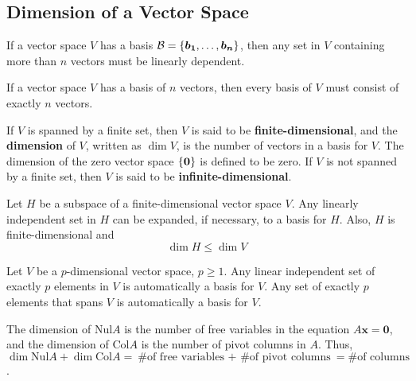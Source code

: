 \documentclass[11pt]{scrartcl}
\theoremstyle{dotlessP}
\theoremstyle{dotlessN}
\DeclarePairedDelimiter\set{\{}{\}}
\newcommand{\nul}{\text{Nul}}
\newcommand{\col}{\text{Col}}
\newcommand{\basis}{\mathcal{B}}
\begin{document}
\subsection{Dimension of a Vector Space}
\begin{theorem}
	If a vector space $V$ has a basis $\basis = \set*{\bm{b_1}, \dots, \bm{b_n}}$, then any set in $V$ containing more than $n$ vectors must be linearly dependent.
\end{theorem}
\begin{theorem}
	If a vector space $V$ has a basis of $n$ vectors, then every basis of $V$ must consist of exactly $n$ vectors.
\end{theorem}
\begin{definition}
	If $V$ is spanned by a finite set, then $V$ is said to be \textbf{finite-dimensional}, and the \textbf{dimension} of $V$, written as $\dim V$, is the number of vectors in a basis for $V$. The dimension of the zero vector space $\set*{\bm{0}}$ is defined to be zero. If $V$ is not spanned by a finite set, then $V$ is said to be \textbf{infinite-dimensional}.
\end{definition}
\begin{theorem}
	Let $H$ be a subspace of a finite-dimensional vector space $V$. Any linearly independent set in $H$ can be expanded, if necessary, to a basis for $H$. Also, $H$ is finite-dimensional and
	\[
	\dim H \leq \dim V
	\] 
\end{theorem}
\begin{theorem}
	Let $V$ be a $p$-dimensional vector space, $p \geq 1$. Any linear independent set of exactly $p$ elements in $V$ is automatically a basis for $V$. Any set of exactly $p$ elements that spans $V$ is automatically a basis for $V$.
\end{theorem}
\begin{remark}
	The dimension of $\nul A$ is the number of free variables in the equation $A\bm{x} = \bm{0}$, and the dimension of $\col A$ is the number of pivot columns in $A$. Thus, $\dim \nul A + \dim \col A = \text{\# of free variables $+$ \# of pivot columns} = \text{\# of columns}$.
\end{remark}
\end{document}
